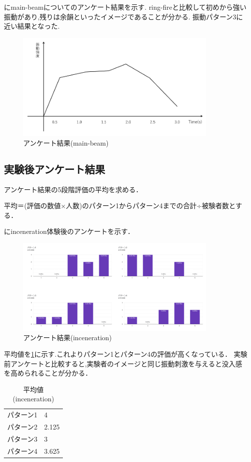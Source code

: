 にmain-beamについてのアンケート結果を示す.
ring-fireと比較して初めから強い振動があり,残りは余韻といったイメージであることが分かる.
振動パターン3に近い結果となった.
\begin{figure}[h]
\centering
\includegraphics[clip,width=10cm]{fig/mainbeamAve.png}
\caption{アンケート結果(main-beam)}\label{mainA}
\end{figure}

\newpage

\subsection{実験後アンケート結果}
アンケート結果の5段階評価の平均を求める．

平均＝(評価の数値×人数)のパターン1からパターン4までの合計÷被験者数とする．

にinceneration体験後のアンケートを示す．

\begin{figure}[h]
  \centering
  \includegraphics[clip,width=10cm]{./fig/incenerationAnk.png}
  \caption{アンケート結果(inceneration)}\label{inceAnk}
  \end{figure}
  


平均値を\ref{tab;inceAvera}に示す.これよりパターン1とパターン4の評価が高くなっている．
実験前アンケートと比較すると,実験者のイメージと同じ振動刺激を与えると没入感を高められることが分かる．
\begin{table}[h]
    \caption{平均値(inceneration)}
    \centering
    \begin{tabular}{l|l}
    \hline
    \hline
    パターン1 & 4\\
    パターン2 & 2.125\\
    パターン3 & 3\\
    パターン4 & 3.625\\
    \hline
    \end{tabular}
    \label{tab;inceAvera}
\end{table}

